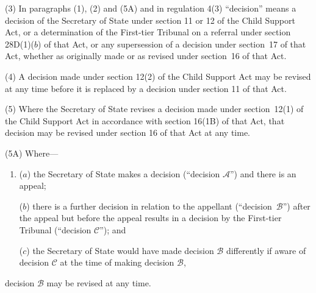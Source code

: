 \documentclass[12pt,a4paper]{article}
\begin{document}

(3) In paragraphs (1), (2) and (5A) and in regulation 4(3) “decision” means a decision of the 
Secretary of State  %
under section %
11 or 12  %
of the Child Support Act, or a determination of 
the First-tier Tribunal  %
on a referral under section 28D(1)($b$)  of that Act, or any supersession of a decision under section~17 of that Act, whether as originally made or as revised under section~16 of that Act.

(4) A decision made under section 12(2) of the Child Support Act may be revised at any time before it is replaced by a decision under section 11 of that Act.

(5) Where the 
Secretary of State  %
revises a decision made under section~12(1) of the Child Support Act in accordance with section 16(1B) of that Act, that decision may be revised under section 16 of that Act at any time.

(5A) Where—
\begin{enumerate}\item[]
($a$) the 
Secretary of State  %
makes a decision (“decision $\mathcal{A}$”) and there is an appeal;

($b$) there is a further decision in relation to the appellant (“decision~$\mathcal{B}$”) after the appeal but before the appeal results in a decision by 
the First-tier Tribunal  %
(“decision $\mathcal{C}$”); and

($c$) the 
Secretary of State  %
would have made decision $\mathcal{B}$ differently if 
aware of decision $\mathcal{C}$ at the time 
of making  %
decision $\mathcal{B}$,
\end{enumerate}
decision $\mathcal{B}$ may be revised at any time.
\end{document}
